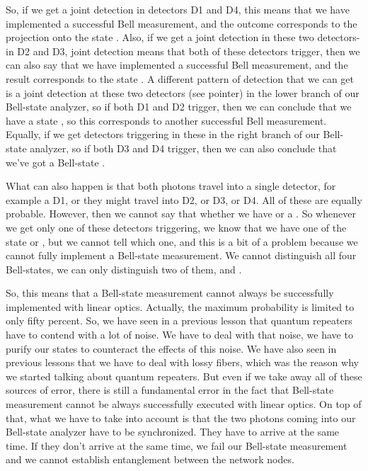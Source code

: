 So, if we get a joint detection in detectors D1 and D4, this means that we have implemented a successful Bell measurement, and the outcome corresponds to the projection onto the state \ket{\Psi^-}. Also, if we get a joint detection in these two detectors- in D2 and D3, joint detection means that both of these detectors trigger, then we can also say that we have implemented a successful Bell measurement, and the result corresponds to the state \ket{\Psi^-}. A different pattern of detection that we can get is a joint detection at these two detectors (see pointer) in the lower branch of our Bell-state analyzer, so if both D1 and D2 trigger, then we can conclude that we have a state \ket{\Psi^+}, so this corresponds to another successful Bell measurement. Equally, if we get detectors triggering in these in the right branch of our Bell-state analyzer, so if both D3 and D4 trigger, then we can also conclude that we've got a Bell-state \ket{\Psi^+}.

What can also happen is that both photons travel into a single detector, for example a D1, or they might travel into D2, or D3, or D4. All of these are equally probable. However, then we cannot say that whether we have \ket{\Phi^+} or a \ket{\Phi^-}. So whenever we get only one of these detectors triggering, we know that we have one of the state \ket{\Psi^+} or \ket{\Psi^-}, but we cannot tell which one, and this is a bit of a problem because we cannot fully implement a Bell-state measurement. We cannot distinguish all four Bell-states, we can only distinguish two of them, \ket{\Psi^+} and \ket{\Psi^-}.

So, this means that a Bell-state measurement cannot always be successfully implemented with linear optics. Actually, the maximum probability is limited to only fifty percent. So, we have seen in a previous lesson that quantum repeaters have to contend with a lot of noise. We have to deal with that noise, we have to purify our states to counteract the effects of this noise. We have also seen in previous lessons that we have to deal with lossy fibers, which was the reason why we started talking about quantum repeaters. But even if we take away all of these sources of error, there is still a fundamental error in the fact that Bell-state measurement cannot be always successfully executed with linear optics. On top of that, what we have to take into account is that the two photons coming into our Bell-state analyzer have to be synchronized. They have to arrive at the same time. If they don't arrive at the same time, we fail our Bell-state measurement and we cannot establish entanglement between the network nodes.



